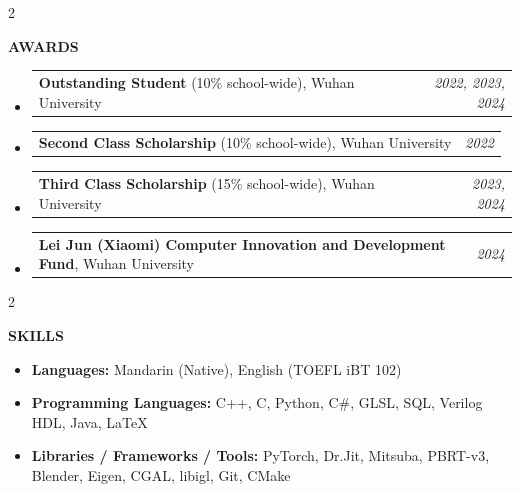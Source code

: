 \documentclass[10pt, letterpaper]{article}
\makeatletter
\newcommand{\sectionlabel}[1]{%
  {\fontsize{9.5pt}{11pt}\selectfont\bfseries\MakeUppercase{#1}}%
}
\newenvironment{cvsection}[1]{%
  \par\vspace{0.86\baselineskip}%
  \Needspace{3\baselineskip}%
  \setcolumnwidth{1.10in,\fill}%
  \begin{paracol}{2}%
  \raggedright\sectionlabel{#1}%
  \switchcolumn
}{%
  \end{paracol}%
}
\newcommand{\awardentry}[2]{%
  \item \begin{tabularx}{\linewidth}[t]{@{}Xr@{}}
    #1 & \textit{#2}
  \end{tabularx}%
}
\makeatother
\begin{document}

\begin{cvsection}{Awards}
\begin{itemize}
  \awardentry{\textbf{Outstanding Student} (10\% school-wide), Wuhan University}{2022, 2023, 2024}
  \awardentry{\textbf{Second Class Scholarship} (10\% school-wide), Wuhan University}{2022}
  \awardentry{\textbf{Third Class Scholarship} (15\% school-wide), Wuhan University}{2023, 2024}
  \awardentry{\textbf{Lei Jun (Xiaomi) Computer Innovation and Development Fund}, Wuhan University}{2024}
\end{itemize}
\end{cvsection}

\begin{cvsection}{Skills}
\begin{itemize}
  \item \textbf{Languages:} Mandarin (Native), English (TOEFL iBT 102)
  \item \textbf{Programming Languages:} C++, C, Python, C\#, GLSL, SQL, Verilog HDL, Java, \LaTeX
  \item \textbf{Libraries / Frameworks / Tools:} PyTorch, Dr.Jit, Mitsuba, PBRT-v3, Blender, Eigen, CGAL, libigl, Git, CMake
\end{itemize}
\end{cvsection}
\end{document}
